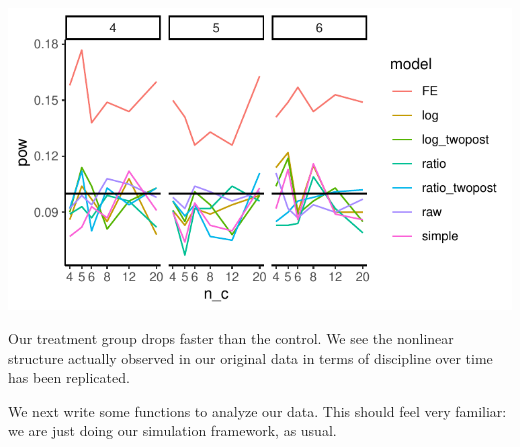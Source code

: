 \documentclass[
]{book}
\begin{document}
\begin{center}\includegraphics[width=0.75\linewidth]{Designing-Simulations-in-R_files/figure-latex/unnamed-chunk-261-1} \end{center}

Our treatment group drops faster than the control. We see the nonlinear structure actually observed in our original data in terms of discipline over time has been replicated.

We next write some functions to analyze our data.
This should feel very familiar: we are just doing our simulation framework, as usual.
\end{document}
